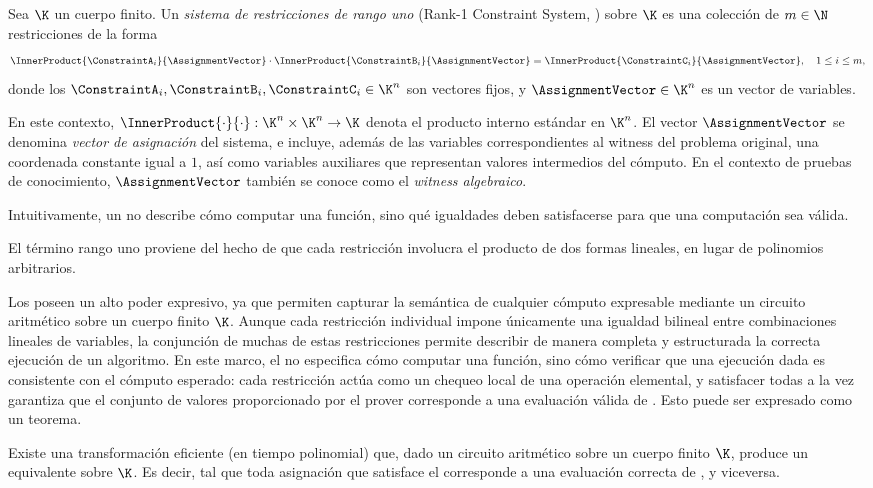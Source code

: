 \begin{definition}[\ROneCS]
	Sea $\K$ un cuerpo finito. Un \emph{sistema de restricciones de rango uno} (Rank-1 Constraint System, \ROneCS) sobre $\K$ es una colección de $m \in \N$ restricciones de la forma
	$$\InnerProduct{\ConstraintA_i}{\AssignmentVector} \cdot \InnerProduct{\ConstraintB_i}{\AssignmentVector} = \InnerProduct{\ConstraintC_i}{\AssignmentVector}, \quad 1 \leq i \leq m,$$
		donde los $\ConstraintA_i, \ConstraintB_i, \ConstraintC_i \in \K^n$ son vectores fijos, y $\AssignmentVector \in \K^n$ es un vector de variables.
	
	En este contexto, $\InnerProduct{\cdot}{\cdot}: \K^n \times \K^n \to \K$ denota el producto interno estándar en $\K^n$. El vector $\AssignmentVector$ se denomina \emph{vector de asignación} del sistema, e incluye, además de las variables correspondientes al witness del problema original, una coordenada constante igual a $1$, así como variables auxiliares que representan valores intermedios del cómputo. En el contexto de pruebas de conocimiento, $\AssignmentVector$ también se conoce como el \emph{witness algebraico}.
\end{definition}

Intuitivamente, un \ROneCS no describe cómo computar una función, sino qué igualdades deben satisfacerse para que una computación sea válida.

El término rango uno proviene del hecho de que cada restricción involucra el producto de dos formas lineales, en lugar de polinomios arbitrarios.

Los \ROneCS poseen un alto poder expresivo, ya que permiten capturar la semántica de cualquier cómputo expresable mediante un circuito aritmético \Circuit sobre un cuerpo finito $\K$. Aunque cada restricción individual impone únicamente una igualdad bilineal entre combinaciones lineales de variables, la conjunción de muchas de estas restricciones permite describir de manera completa y estructurada la correcta ejecución de un algoritmo. En este marco, el \ROneCS no especifica cómo computar una función, sino cómo verificar que una ejecución dada es consistente con el cómputo esperado: cada restricción actúa como un chequeo local de una operación elemental, y satisfacer todas a la vez garantiza que el conjunto de valores proporcionado por el prover corresponde a una evaluación válida de \Circuit. Esto puede ser expresado como un teorema.

\begin{theorem}
	Existe una transformación eficiente (en tiempo polinomial) que, dado un circuito aritmético \Circuit sobre un cuerpo finito $\K$, produce un \ROneCS equivalente sobre $\K$. Es decir, tal que toda asignación que satisface el \ROneCS corresponde a una evaluación correcta de \Circuit, y viceversa.
\end{theorem}

